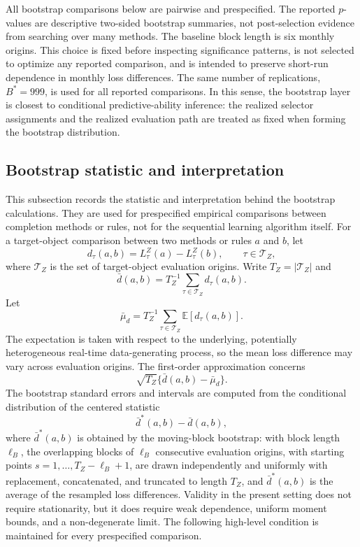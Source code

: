 \documentclass[a4paper,12pt]{article}
\newcommand{\E}{\mathbb{E}}
\newcommand{\Tcal}{\mathcal{T}}
\newcommand{\1}{\mathbf{1}}
\begin{document}
All bootstrap comparisons below are pairwise and prespecified. The reported $p$-values are descriptive two-sided bootstrap summaries, not post-selection evidence from searching over many methods. The baseline block length is six monthly origins. This choice is fixed before inspecting significance patterns, is not selected to optimize any reported comparison, and is intended to preserve short-run dependence in monthly loss differences. The same number of replications, $B^\ast=999$, is used for all reported comparisons. In this sense, the bootstrap layer is closest to conditional predictive-ability inference: the realized selector assignments and the realized evaluation path are treated as fixed when forming the bootstrap distribution.

\subsection{Bootstrap statistic and interpretation}
\label{ia:bootstrap_scope}

This subsection records the statistic and interpretation behind the bootstrap calculations. They are used for prespecified empirical comparisons between completion methods or rules, not for the sequential learning algorithm itself. For a target-object comparison between two methods or rules $a$ and $b$, let
\[
    d_\tau(a,b)=L^Z_\tau(a)-L^Z_\tau(b),\qquad \tau\in\Tcal_Z,
\]
where $\Tcal_Z$ is the set of target-object evaluation origins. Write $T_Z=|\Tcal_Z|$ and
\[
    \bar d(a,b)=T_Z^{-1}\sum_{\tau\in\Tcal_Z}d_\tau(a,b).
\]
Let
\[
    \bar\mu_d=T_Z^{-1}\sum_{\tau\in\Tcal_Z}\E[d_\tau(a,b)].
\]
The expectation is taken with respect to the underlying, potentially heterogeneous real-time data-generating process, so the mean loss difference may vary across evaluation origins. The first-order approximation concerns
\[
    \sqrt{T_Z}\{\bar d(a,b)-\bar\mu_d\}.
\]
The bootstrap standard errors and intervals are computed from the conditional distribution of the centered statistic
\[
    \bar d^\ast(a,b)-\bar d(a,b),
\]
where $\bar d^\ast(a,b)$ is obtained by the moving-block bootstrap: with block length $\ell_B$, the overlapping blocks of $\ell_B$ consecutive evaluation origins, with starting points $s=1,\ldots,T_Z-\ell_B+1$, are drawn independently and uniformly with replacement, concatenated, and truncated to length $T_Z$, and $\bar d^\ast(a,b)$ is the average of the resampled loss differences. Validity in the present setting does not require stationarity, but it does require weak dependence, uniform moment bounds, and a non-degenerate limit. The following high-level condition is maintained for every prespecified comparison.
\end{document}
